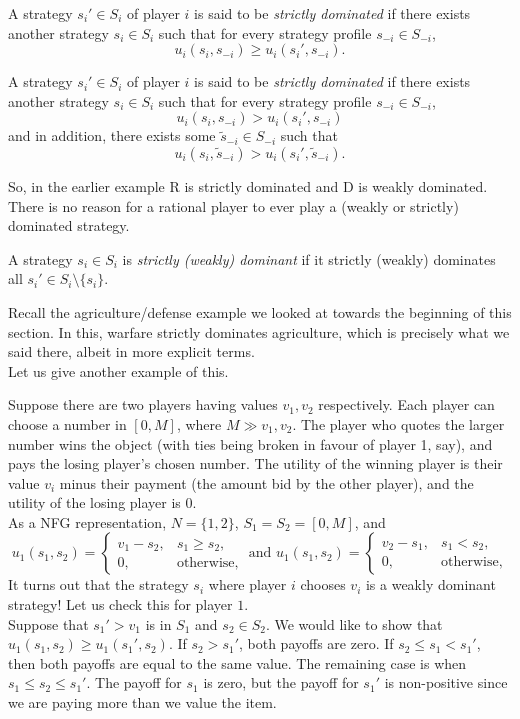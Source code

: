 	\begin{fdef}
		A strategy $s_i' \in S_i$ of player $i$ is said to be \emph{strictly dominated} if there exists another strategy $s_i \in S_i$ such that for every strategy profile $s_{-i} \in S_{-i}$,
		\[ u_i(s_i,s_{-i}) \ge u_i(s_i',s_{-i}). \]

		A strategy $s_i' \in S_i$ of player $i$ is said to be \emph{strictly dominated} if there exists another strategy $s_i \in S_i$ such that for every strategy profile $s_{-i} \in S_{-i}$,
		\[ u_i(s_i,s_{-i}) > u_i(s_i',s_{-i}) \]
		and in addition, there exists some $\tilde{s}_{-i} \in S_{-i}$ such that
		\[ u_i(s_i,\tilde{s}_{-i}) > u_i(s_i',\tilde{s}_{-i}). \]
	\end{fdef}
	So, in the earlier example R is strictly dominated and D is weakly dominated.\\
	There is no reason for a rational player to ever play a (weakly or strictly) dominated strategy.

	\begin{fdef}
		A strategy $s_i \in S_i$ is \emph{strictly (weakly) dominant} if it strictly (weakly) dominates all $s_i' \in S_i \setminus \{s_i\}$.
	\end{fdef}

	Recall the agriculture/defense example we looked at towards the beginning of this section. In this, warfare strictly dominates agriculture, which is precisely what we said there, albeit in more explicit terms.\\

	Let us give another example of this.

	\begin{fex}
		Suppose there are two players having values $v_1,v_2$ respectively. Each player can choose a number in $[0,M]$, where $M \gg v_1,v_2$. The player who quotes the larger number wins the object (with ties being broken in favour of player \textsf{1}, say), and pays the losing player's chosen number. The utility of the winning player is their value $v_i$ minus their payment (the amount bid by the other player), and the utility of the losing player is $0$.\\
		As a NFG representation, $N = \{1,2\}$, $S_1 = S_2 = [0,M]$, and
		\[ u_1(s_1,s_2) = \begin{cases} v_1 - s_2, & s_1 \ge s_2, \\ 0, & \text{otherwise,} \end{cases} \text{ and } u_1(s_1,s_2) = \begin{cases} v_2 - s_1, & s_1 < s_2, \\ 0, & \text{otherwise,} \end{cases} \]
		It turns out that the strategy $s_i$ where player $i$ chooses $v_i$ is a weakly dominant strategy! Let us check this for player $1$.\\
		Suppose that $s_1' > v_1$ is in $S_1$ and $s_2 \in S_2$. We would like to show that $u_1(s_1,s_2) \ge u_1(s_1',s_2)$. If $s_2 > s_1'$, both payoffs are zero. If $s_2 \le s_1 < s_1'$, then both payoffs are equal to the same value. The remaining case is when $s_1 \le s_2 \le s_1'$. The payoff for $s_1$ is zero, but the payoff for $s_1'$ is non-positive since we are paying more than we value the item.
	\end{fex}

